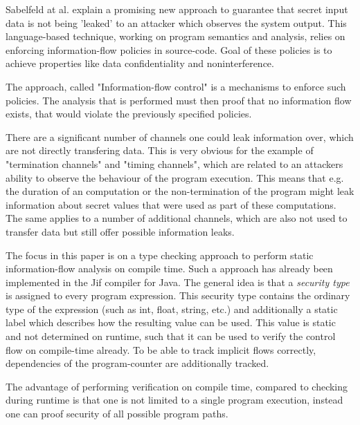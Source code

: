 \documentclass[a4paper,UKenglish]{lipics-v2018}
\begin{document}
Sabelfeld at al. explain a promising new approach to guarantee that secret input data is not being 'leaked' to an attacker which observes the system output. This language-based technique, working on program semantics and analysis, relies on enforcing information-flow policies in source-code. Goal of these policies is to achieve properties like data confidentiality and noninterference.\cite{language_based_information_flow_security}

The approach, called "Information-flow control" is a mechanisms to enforce such policies. The analysis that is performed must then proof that no information flow exists, that would violate the previously specified policies.\cite{language_based_information_flow_security}

There are a significant number of channels one could leak information over, which are not directly transfering data. This is very obvious for the example of "termination channels" and "timing channels", which are related to an attackers ability to observe the behaviour of the program execution. This means that e.g. the duration of an computation or the non-termination of the program might leak information about secret values that were used as part of these computations.
The same applies to a number of additional channels, which are also not used to transfer data but still offer possible information leaks.\cite{language_based_information_flow_security} %

The focus in this paper is on a type checking approach to perform static information-flow analysis on compile time. Such a approach has already been implemented in the Jif compiler for Java.\cite{JFlow} The general idea is that a \textit{security type} is assigned to every program expression. This security type contains the ordinary type of the expression (such as int, float, string, etc.) and additionally a static label which describes how the resulting value can be used. This value is static and not determined on runtime, such that it can be used to verify the control flow on compile-time already.\cite{language_based_information_flow_security}
To be able to track implicit flows correctly, dependencies of the program-counter are additionally tracked.

The advantage of performing verification on compile time, compared to checking during runtime is that one is not limited to a single program execution, instead one can proof security of all possible program paths.\cite{language_based_information_flow_security}
\end{document}
